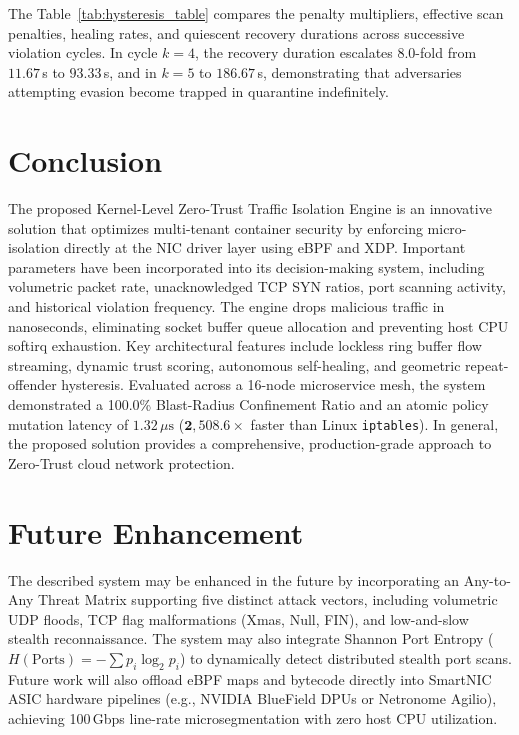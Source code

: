 \documentclass[conference]{IEEEtran}
\begin{document}
The Table~\ref{tab:hysteresis_table} compares the penalty multipliers, effective scan penalties, healing rates, and quiescent recovery durations across successive violation cycles. In cycle $k=4$, the recovery duration escalates 8.0-fold from $11.67$\,s to $93.33$\,s, and in $k=5$ to $186.67$\,s, demonstrating that adversaries attempting evasion become trapped in quarantine indefinitely.

\section{Conclusion}
The proposed Kernel-Level Zero-Trust Traffic Isolation Engine is an innovative solution that optimizes multi-tenant container security by enforcing micro-isolation directly at the NIC driver layer using eBPF and XDP. Important parameters have been incorporated into its decision-making system, including volumetric packet rate, unacknowledged TCP SYN ratios, port scanning activity, and historical violation frequency. The engine drops malicious traffic in nanoseconds, eliminating socket buffer queue allocation and preventing host CPU softirq exhaustion. Key architectural features include lockless ring buffer flow streaming, dynamic trust scoring, autonomous self-healing, and geometric repeat-offender hysteresis. Evaluated across a 16-node microservice mesh, the system demonstrated a 100.0\% Blast-Radius Confinement Ratio and an atomic policy mutation latency of $1.32\,\mu\text{s}$ ($\mathbf{2,508.6\times}$ faster than Linux \texttt{iptables}). In general, the proposed solution provides a comprehensive, production-grade approach to Zero-Trust cloud network protection.

\section{Future Enhancement}
The described system may be enhanced in the future by incorporating an Any-to-Any Threat Matrix supporting five distinct attack vectors, including volumetric UDP floods, TCP flag malformations (Xmas, Null, FIN), and low-and-slow stealth reconnaissance. The system may also integrate Shannon Port Entropy ($H(\text{Ports}) = -\sum p_i \log_2 p_i$) to dynamically detect distributed stealth port scans. Future work will also offload eBPF maps and bytecode directly into SmartNIC ASIC hardware pipelines (e.g., NVIDIA BlueField DPUs or Netronome Agilio), achieving 100\,Gbps line-rate microsegmentation with zero host CPU utilization.
\end{document}
